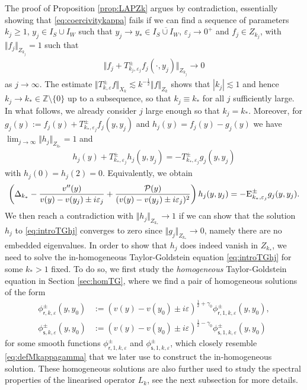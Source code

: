 \documentclass[11pt,reqno]{amsproc}
\theoremstyle{definition}
\numberwithin{equation}{section}
\newcommand{\D}{{\Delta}}
\newcommand{\sr}{{\mathsf{r}}}
\newcommand{\s}{{\mathsf{s}}}
\newcommand{\ep}{\varepsilon}
\renewcommand{\P}{{\mathcal{P}}}
\begin{document}
The proof of Proposition \ref{prop:LAPZk} argues by contradiction, essentially showing that \eqref{eq:coercivitykappa} fails if we can find a sequence of parameters $k_j\geq 1$, $y_j\in I_S\cup I_W$ such that $y_j\rightarrow y_*\in \overline{I_S\cup I_W}$, $\ep_j\rightarrow 0^+$ and $f_j\in Z_{k_j}$, with $\Vert f_j\Vert_{Z_{k_j}}=1$ such that 
\begin{align}\label{eq:introfailureLAP}
\Vert f_j + T_{k_j,\ep_j}^\pm f_j(\cdot,y_j)\Vert_{Z_{k_j}} \rightarrow 0
\end{align}
as $j\rightarrow \infty$. The estimate $\Vert T_{k,\ep}^\pm f \Vert_{X_k}\lesssim k^{-\frac12}\Vert f \Vert_{Z_k}$ shows that $|k_j|\lesssim 1$ and hence $k_j\rightarrow k_*\in \mathbb{Z}\setminus \lbrace 0 \rbrace$ up to a subsequence, so that $k_j \equiv k_*$ for all $j$ sufficiently large. In what follows, we already consider $j$ large enough so that $k_j=k_*$. Moreover, for $g_j(y):=f_j(y) + T_{k_*,\ep_j}^\pm f_j(y,y_j)$ and $h_j(y) = f_j(y) - g_j(y)$ we have $\lim_{j\rightarrow \infty} \Vert h_j \Vert_{Z_{k_*}}=1$ and
\begin{align}\label{eq:introdefRj}
h_j(y) + T_{k_*,\ep_j}^\pm h_j(y,y_j) = -T_{k_*,\ep_j}^\pm g_j(y,y_j) 
\end{align}
with $h_j(0)=h_j(2)=0$. Equivalently, we obtain
\begin{equation}\label{eq:introTGhj}
\left( \D_{k_*} - \frac{v''(y)}{v(y) - v(y_j) \pm i\ep_j} + \frac{\P(y)}{(v(y) - v(y_j) \pm i\ep_j)^2}\right) h_j(y,y_j) = -\textsc{E}_{k_*,\ep_j}^\pm g_j(y,y_j).
\end{equation}
We then reach a contradiction with $\Vert h_j \Vert_{Z_{k_*}}\rightarrow 1$ if we can show that the solution $h_j$ to \eqref{eq:introTGhj} converges to zero since $\Vert g_j\Vert_{Z_{k_*}}\rightarrow 0$, namely there are no embedded eigenvalues. In order to show that $h_j$ does indeed vanish in $Z_{k_*}$, we need to solve the in-homogeneous Taylor-Goldstein equation \eqref{eq:introTGhj} for some $k_*>1$ fixed. To do so, we first study the \textit{homogeneous} Taylor-Goldstein equation in Section \ref{sec:homTG}, where we find a pair of homogeneous solutions of the form
\begin{equation}\label{eq:introdefphisigma}
\begin{split}
\phi_{\sr,k,\ep}^\pm(y,y_0) &:= (v(y) - v(y_0) \pm i\ep)^{\frac12+\gamma_0}\phi_{\sr,1,k,\ep}^\pm(y,y_0) , \\
\phi_{\s,k,\ep}^\pm(y,y_0) &:= (v(y) - v(y_0) \pm i\ep)^{\frac12-\gamma_0}\phi_{\s,1,k,\ep}^\pm(y,y_0)
\end{split}
\end{equation}
for some smooth functions $\phi_{\sr,1,k,\ep}^\pm$ and $\phi_{\s,1,k,\ep}^\pm$, which closely resemble \eqref{eq:defMkappagamma} that we later use to construct the in-homogeneous solution. These homogeneous solutions are also further used to study the spectral properties of the linearised operator $L_k$, see the next subsection for more details.
\end{document}
